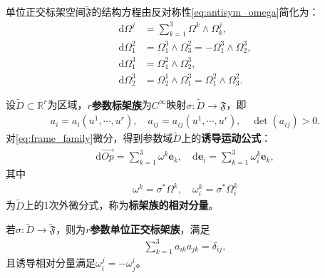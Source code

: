 \documentclass[../../main.tex]{subfiles}%
\begin{document}
\begin{remark}
单位正交标架空间$\tilde{\mathfrak{F}}$的结构方程由反对称性\eqref{eq:antisym_omega}简化为：
\begin{align*}
\mathrm{d}\Omega^j&=\sum\limits_{k=1}^3\Omega^k\wedge\Omega_k^j,\\
\mathrm{d}\Omega_1^2&=\Omega_1^3\wedge\Omega_3^2=-\Omega_1^3\wedge\Omega_2^3,\\
\mathrm{d}\Omega_1^3&=\Omega_1^2\wedge\Omega_2^3,\\
\mathrm{d}\Omega_2^3&=\Omega_2^1\wedge\Omega_1^3=\Omega_1^2\wedge\Omega_3^2.
\end{align*}
\end{remark}

\begin{definition}
设$\tilde{D}\subset\mathbb{R}^r$为区域，\textbf{$r$参数标架族}为$C^\infty$映射$\sigma:\tilde{D}\to\mathfrak{F}$，即
\begin{align}
a_i=a_i(u^1,\cdots,u^r),\quad a_{ij}=a_{ij}(u^1,\cdots,u^r),\quad \det(a_{ij})>0.
\label{eq:frame_family}
\end{align}
对\eqref{eq:frame_family}微分，得到参数域$\tilde{D}$上的\textbf{诱导运动公式}：
\begin{align}
\mathrm{d}\overrightarrow{Op}=\sum\limits_{k=1}^3\omega^k\boldsymbol{e}_k,\quad \mathrm{d}\boldsymbol{e}_i=\sum\limits_{k=1}^3\omega_i^k\boldsymbol{e}_k,
\label{eq:induced_motion}
\end{align}
其中
\begin{align}
\omega^k=\sigma^*\Omega^k,\quad \omega_i^k=\sigma^*\Omega_i^k
\label{eq:induced_rel_comp}
\end{align}
为$\tilde{D}$上的1次外微分式，称为\textbf{标架族的相对分量}。

若$\sigma:\tilde{D}\to\tilde{\mathfrak{F}}$，则为\textbf{$r$参数单位正交标架族}，满足
\begin{align}
\sum\limits_{k=1}^3a_{ik}a_{jk}=\delta_{ij},
\label{eq:ortho_family_cond}
\end{align}
且诱导相对分量满足$\omega_i^j=-\omega_j^i$。
\end{definition}
\end{document}
